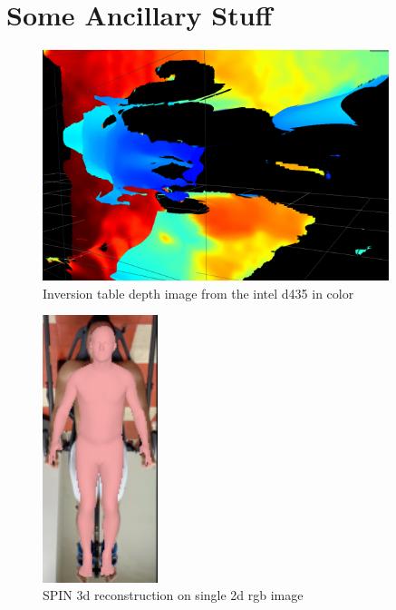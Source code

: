 
\chapter{Some Ancillary Stuff}

\begin{figure}[h]
        \caption{Inversion table depth image from the intel d435 in color}
        \centering
        \includegraphics[width=0.9\textwidth]{images/inversion_depth.png}
\end{figure}
 

\begin{figure}[h]
        \caption{SPIN 3d reconstruction on single 2d rgb image}
        \centering
        \includegraphics[width=0.3\textwidth]{images/spin.png}
\end{figure}

